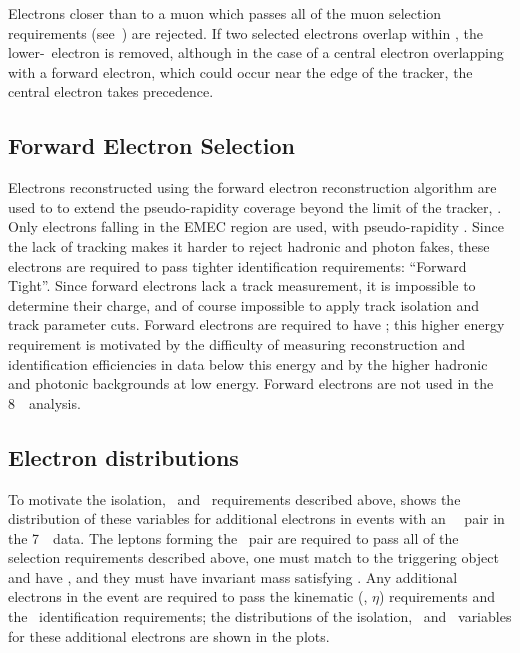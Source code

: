 Electrons closer than  to a muon which passes all of the muon selection
requirements (see~) are rejected. If two selected electrons
overlap within , the lower-\et\ electron is removed, although in
the case of a central electron overlapping with a forward electron, which could
occur near the edge of the tracker, the central electron takes precedence.

\subsection{Forward Electron Selection}

Electrons reconstructed using the forward electron reconstruction algorithm are
used to to extend the pseudo-rapidity coverage beyond the limit of the tracker,
. Only electrons falling in the EMEC region are used, with
pseudo-rapidity .  Since the lack of tracking makes it
harder to reject hadronic and photon fakes, these electrons are required to
pass tighter identification requirements: ``Forward Tight''. Since forward
electrons lack a track measurement, it is impossible to determine their charge,
and of course impossible to apply track isolation and track parameter cuts.
Forward electrons are required to have ; this higher energy requirement
is motivated by the difficulty of measuring reconstruction and identification
efficiencies in data below this energy and by the higher hadronic and photonic
backgrounds at low energy.
Forward electrons are not used in the 8~\tev\ analysis.

\subsection{Electron distributions}

To motivate the isolation, \dzerosig\ and \zzero\ requirements described
above,  shows the distribution of these variables for additional
electrons in events with an \ossf\ \dilepton\ pair in the 7~\tev\ data. 
The leptons forming the \dilepton\ pair are required to pass all of
the selection requirements described above, one must match to the triggering
object and have , and they must have invariant mass satisfying \sstooos. Any additional electrons in the event are required to pass
the kinematic (\pt, $\eta$) requirements and the \loosePP\ identification
requirements; the distributions of the isolation, \dzerosig\ and \zzero\
variables for these additional electrons are shown in the plots. 

